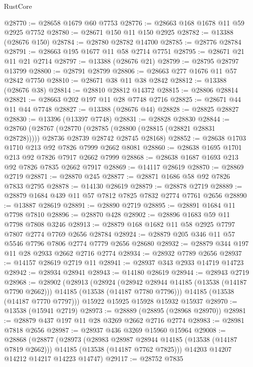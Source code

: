 \begin{lexlean}{RustCore}
\begin{coremodule}
@28770 := @28658 @1679 @60 @7753
@28776 := @28663 @168 @1678 @11 @59 @2925 @7752
@28780 := @28671 @150 @11 @150 @2925
@28782 := @13388 (@28676 @150)
@28784 := @28780 @28782 @14700
@28785 := @28776 @28784
@28791 := @28663 @195 @1677 @11 @58 @2714 @7751
@28795 := @28671 @21 @11 @21 @2714
@28797 := @13388 (@28676 @21)
@28799 := @28795 @28797 @13799
@28800 := @28791 @28799
@28806 := @28663 @277 @1676 @11 @57 @2842 @7750
@28810 := @28671 @38 @11 @38 @2842
@28812 := @13388 (@28676 @38)
@28814 := @28810 @28812 @14372
@28815 := @28806 @28814
@28821 := @28663 @202 @197 @11 @28 @7748 @2716
@28825 := @28671 @44 @11 @44 @7748
@28827 := @13388 (@28676 @44)
@28828 := @28825 @28827
@28830 := @13396 (@13397 @7748)
@28831 := @28828 @28830
@28844 := @28760
    (@28767
      (@28770 (@28785 (@28800 (@28815 (@28821 @28831 @28728)))))
      @28736
      @28739
      @28742
      @28745
      @28168)
@28852 := @28638 @1703 @1710 @213 @92 @7826 @7999 @2662 @8081
@28860 := @28638 @1695 @1701 @213 @92 @7826 @7917 @2662 @7999
@28868 := @28638 @1687 @1693 @213 @92 @7826 @7835 @2662 @7917
@28869 := @14117 @28619
@28870 := @28869 @2719
@28871 := @28870 @245
@28877 := @28871 @1686 @58 @92 @7826 @7833 @2795
@28878 := @14130 @28619
@28879 := @28878 @2719
@28889 := @28879 @1684 @439 @11 @57 @7812 @7825 @7832 @2774 @7761 @2656
@28890 := @13887 @28619
@28891 := @28890 @2719
@28895 := @28891 @1684 @11 @7798 @7810
@28896 := @28870 @428
@28902 := @28896 @1683 @59 @11 @7798 @7808 @3246
@28913 := @28879 @168 @1682 @11 @58 @2925 @7797 @7807 @2774 @7769 @2656 @28784
@28924 := @28879 @205 @346 @11 @57 @5546 @7796 @7806 @2774 @7779 @2656 @28680
@28932 := @28879 @344 @197 @11 @28 @2933 @2662 @2716 @2774
@28934 := @28932 @7789 @2656
@28937 := @14157 @28619 @2719 @11
@28941 := @28937 @343 @2933 @14719 @14723
@28942 := @28934 @28941
@28943 := @14180 @28619
@28944 := @28943 @2719
@28968 := @28902
    (@28913
      (@28924
        (@28942 @28944 @14185 (@13538 (@14187 @7790 @2662)))
        @14185
        (@13538 (@14187 @7780 @7796)))
      @14185
      (@13538 (@14187 @7770 @7797)))
    @15922
    @15925
    @15928
    @15932
    @15937
@28970 := @13538 (@15941 @2719)
@28973 := @28889 (@28895 (@28968 @28970))
@28981 := @28879 @437 @197 @11 @28 @3269 @2662 @2716 @2774
@28983 := @28981 @7818 @2656
@28987 := @28937 @436 @3269 @15960 @15964
@29008 := @28868
    (@28877
      (@28973
        (@28983 @28987 @28944 @14185 (@13538 (@14187 @7819 @2662)))
        @14185
        (@13538 (@14187 @7762 @7825)))
      @14203
      @14207
      @14212
      @14217
      @14223
      @14747)
@29117 := @28752
    @7835

\end{coremodule}
\end{lexlean}
